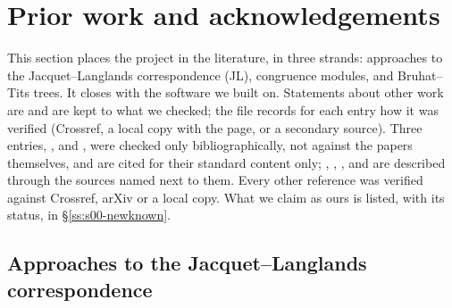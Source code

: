 \section{Prior work and acknowledgements}\label{ss:s00-prior}

This section places the project in the literature, in three strands: approaches to the Jacquet--Langlands correspondence (JL),
congruence modules, and Bruhat--Tits trees. It closes with the software we built on. Statements about other work are
\stcited{} and are kept to what we checked; the file  records for each entry how it was verified (Crossref, a local copy with the page, or a secondary source). Three entries, \cite{Ih75}, \cite{Ri84} and \cite{Piz80}, were checked only bibliographically, not against the papers themselves, and are cited for their standard content only; \cite{KM86}, \cite{DKV84}, \cite{Len95}, \cite{Mes86} and \cite{DiaInv97} are described through the sources named next to them. Every other reference was verified against Crossref, arXiv or a local copy.
What we claim as ours is listed, with its status, in \S\ref{ss:s00-newknown}.

\subsection{Approaches to the Jacquet--Langlands correspondence}

